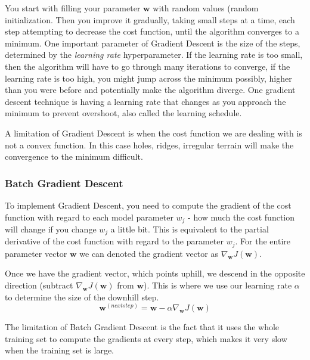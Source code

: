 \documentclass[12pt]{article}
\begin{document}
        You start with filling your parameter $\boldsymbol{w}$ with random values (random initialization. Then you
        improve it gradually, taking small steps at a time, each step attempting to decrease the cost function, until
        the algorithm converges to a minimum. One important parameter of Gradient Descent is the size of the steps,
        determined by the \textit{learning rate} hyperparameter. If the learning rate is too small, then the algorithm
        will have to go through many iterations to converge, if the learning rate is too high, you might jump across the
        minimum possibly, higher than you were before and potentially make the algorithm diverge. One gradient descent
        technique is having a learning rate that changes as you approach the minimum to prevent overshoot, also called
        the learning schedule.

        A limitation of Gradient Descent is when the cost function we are dealing with is not a convex function. In this
        case holes, ridges, irregular terrain will make the convergence to the minimum difficult.

        \subsubsection{Batch Gradient Descent}
            To implement Gradient Descent, you need to compute the gradient of the cost function with regard to each
            model parameter $w_j$ - how much the cost function will change if you change $w_j$ a little bit. This is
            equivalent to the partial derivative of the cost function with regard to the parameter $w_j$. For the entire
            parameter vector $\boldsymbol{w}$ we can denoted the gradient vector as $\nabla_{\boldsymbol{w}}
            J(\boldsymbol{w})$.

            Once we have the gradient vector, which points uphill, we descend in the opposite direction (subtract
            $\nabla_{\boldsymbol{w}} J(\boldsymbol{w})$ from $\boldsymbol{w}$). This is where we use our learning rate
            $\alpha$ to determine the size of the downhill step.
            $$ \boldsymbol{w}^{(next step)} = \boldsymbol{w} - \alpha \nabla_{\boldsymbol{w}} J(\boldsymbol{w}) $$

            The limitation of Batch Gradient Descent is the fact that it uses the whole training set to compute the
            gradients at every step, which makes it very slow when the training set is large.
        
\end{document}

